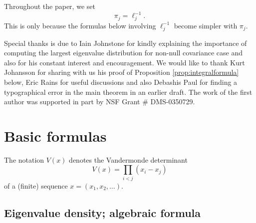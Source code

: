 \documentclass[11pt]{article}
\begin{document}
\begin{nrem}
Throughout the paper, we set
\begin{equation}
  \pi_j=\ell_j^{-1}.
\end{equation}
This is only because the formulas below involving $\ell_j^{-1}$
become simpler with $\pi_j$.
\end{nrem}



\bigskip

 Special thanks is due to Iain
Johnstone for kindly explaining the importance of computing the
largest eigenvalue distribution for non-null covariance case and
also for his constant interest and encouragement. We would like to
thank Kurt Johansson for sharing with us his  proof of Proposition
\ref{prop:integralformula} below, Eric Rains for useful
discussions and also Debashis Paul for finding a typographical
error in the main theorem in an earlier draft. The work of the
first author was supported in part by NSF Grant \# DMS-0350729.







\section{Basic formulas}\label{sec:basicformulas}


\begin{nrem}
The notation $V(x)$ denotes the
Vandermonde determinant
\begin{equation}
  V(x)=\prod_{i<j} (x_i-x_j)
\end{equation}
of a (finite) sequence $x=(x_1,x_2,\dots)$.
\end{nrem}

\subsection{Eigenvalue density; algebraic formula}
\end{document}
